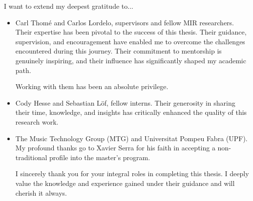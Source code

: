 

\begin{acknowledgement}

I want to extend my deepest gratitude to...

\begin{itemize}
\item Carl Thomé and Carlos Lordelo, supervisors and fellow MIR researchers. Their expertise has been pivotal to the success of this thesis. Their guidance, supervision, and encouragement have enabled me to overcome the challenges encountered during this journey. Their commitment to mentorship is genuinely inspiring, and their influence has significantly shaped my academic path. 

Working with them has been an absolute privilege.

\vspace*{3mm}
\item Cody Hesse and Sebastian Löf, fellow interns. Their generosity in sharing their time, knowledge, and insights has critically enhanced the quality of this research work.

\vspace*{3mm}
\item The Music Technology Group (MTG) and Universitat Pompeu Fabra (UPF). My profound thanks go to Xavier Serra for his faith in accepting a non-traditional profile into the master's program.

\vspace*{3mm}

I sincerely thank you for your integral roles in completing this thesis. I deeply value the knowledge and experience gained under their guidance and will cherish it always.

\vspace*{3mm}
\end{itemize}

\newpage
\end{acknowledgement}